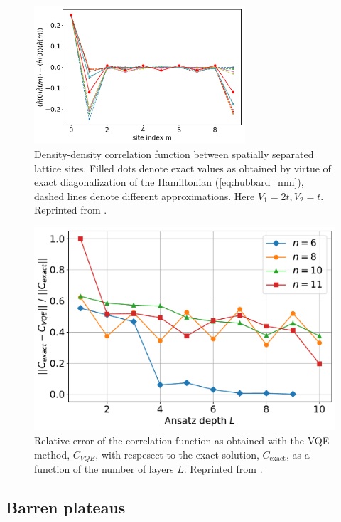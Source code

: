 \begin{figure}
    \centering
    \includegraphics*[width=0.7\textwidth]{figures/Correlation.pdf}
    \caption{Density-density correlation function between spatially separated lattice sites. Filled dots denote exact values as obtained by virtue of exact diagonalization of the Hamiltonian (\ref{eq:hubbard_nnn}), dashed lines denote different approximations. Here $V_1 = 2t, V_2 = t$. Reprinted from \cite{uvarov_variational_2020}.}
    \label{fig:correlation}
\end{figure}

\begin{figure}
    \centering
    \includegraphics[width=0.7\linewidth]{figures/error_norms}
    \caption{Relative error of the correlation function as obtained with the VQE method, $C_{VQE}$, with respesect to the exact solution, $C_\mathrm{exact}$, as a function of the number of layers $L$. Reprinted from \cite{uvarov_variational_2020}.}
    \label{fig:corr_errors}
    \end{figure}{}

\subsection{Barren plateaus}

